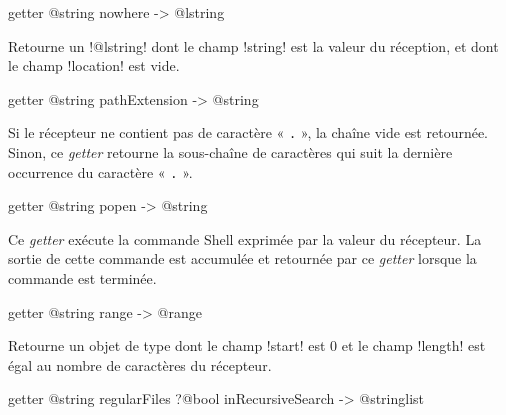 
\begin{galgasbox}
getter @string nowhere -> @lstring
\end{galgasbox}

Retourne un \ggs!@lstring! dont le champ \ggs!string! est la valeur du réception, et dont le champ \ggs!location! est vide.








\begin{galgasbox}
getter @string pathExtension -> @string
\end{galgasbox}

Si le récepteur ne contient pas de caractère « \texttt{.} », la chaîne vide est retournée. Sinon, ce \emph{getter} retourne la sous-chaîne de caractères qui suit la dernière occurrence du caractère « \texttt{.} ».









\begin{galgasbox}
getter @string popen -> @string
\end{galgasbox}

Ce \emph{getter} exécute la commande Shell exprimée par la valeur du récepteur. La sortie de cette commande est accumulée et retournée par ce \emph{getter} lorsque la commande est terminée.









\begin{galgasbox}
getter @string range -> @range
\end{galgasbox}

Retourne un objet de type  dont le champ \ggs!start! est $0$ et le champ \ggs!length! est égal au nombre de caractères du récepteur.









\begin{galgasbox}
getter @string regularFiles ?@bool inRecursiveSearch -> @stringlist
\end{galgasbox}

